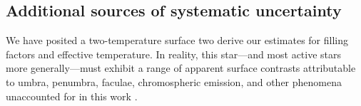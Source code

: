 \documentclass[modern,trackchanges]{aastex631}
\begin{document}







\subsection{Additional sources of systematic uncertainty}
\label{sec:uncertainties}
We have posited a two-temperature surface two derive our estimates for filling factors and effective temperature.  In reality, this star---and most active stars more generally---must exhibit a range of apparent surface contrasts attributable to umbra, penumbra, faculae, chromospheric emission, and other phenomena unaccounted for in this work \citep{berdyugina05, 2009A&ARv..17..251S}.  
\end{document}
